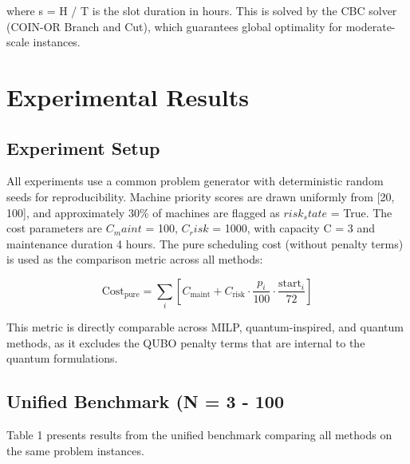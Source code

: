 where s = H / T is the slot duration in hours. This is solved by the CBC solver (COIN-OR Branch and Cut), which guarantees global optimality for moderate-scale instances.

\section{Experimental Results}
\subsection{Experiment Setup}
All experiments use a common problem generator with deterministic random seeds for reproducibility. Machine priority scores are drawn uniformly from [20, 100], and approximately 30\% of machines are flagged as $risk_state$ = True. The cost parameters are $C_maint$ = 100, $C_risk$ = 1000, with capacity C = 3 and maintenance duration 4 hours.
The pure scheduling cost (without penalty terms) is used as the comparison metric across all methods:

\begin{equation}
\text{Cost}_{\text{pure}} 
= \sum_{i} \left[
C_{\text{maint}} 
+ C_{\text{risk}} \cdot \frac{p_i}{100} \cdot \frac{\text{start}_i}{72}
\right]
\end{equation}

This metric is directly comparable across MILP, quantum-inspired, and quantum methods, as it excludes the QUBO penalty terms that are internal to the quantum formulations.

\subsection{Unified Benchmark (N = 3 - 100}
Table 1 presents results from the unified benchmark comparing all methods on the same problem instances.

